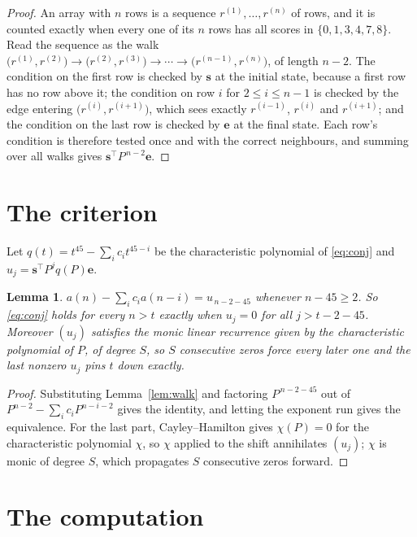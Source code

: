 \documentclass[11pt,a4paper]{article}
\theoremstyle{plain}
\newtheorem{lemma}[theorem]{Lemma}
\theoremstyle{definition}
\begin{document}
\begin{proof}
An array with $n$ rows is a sequence $r^{(1)},\dots,r^{(n)}$ of rows, and it is counted
exactly when every one of its $n$ rows has all scores in $\{0,1,3,4,7,8\}$. Read the sequence as the
walk $\bigl(r^{(1)},r^{(2)}\bigr)\to\bigl(r^{(2)},r^{(3)}\bigr)\to\cdots\to
\bigl(r^{(n-1)},r^{(n)}\bigr)$, of length $n-2$. The condition on the first row is
checked by $\mathbf{s}$ at the initial state, because a first row has no row above it; the
condition on row $i$ for $2\le i\le n-1$ is checked by the edge entering
$\bigl(r^{(i)},r^{(i+1)}\bigr)$, which sees exactly $r^{(i-1)}$, $r^{(i)}$ and
$r^{(i+1)}$; and the condition on the last row is checked by $\mathbf{e}$ at the final
state. Each row's condition is therefore tested once and with the correct neighbours, and
summing over all walks gives $\mathbf{s}^{\!\top}P^{\,n-2}\mathbf{e}$.
\end{proof}

\section{The criterion}

Let $q(t)=t^{45}-\sum_i c_i t^{45-i}$ be the characteristic polynomial of
\eqref{eq:conj} and $u_j=\mathbf{s}^{\!\top}P^{j}q(P)\mathbf{e}$.

\begin{lemma}\label{lem:crit}
$a(n)-\sum_i c_i a(n-i)=u_{\,n-2-45}$ whenever $n-45\ge2$. So \eqref{eq:conj}
holds for every $n>t$ exactly when $u_j=0$ for all $j>t-2-45$. Moreover $(u_j)$
satisfies the monic linear recurrence given by the characteristic polynomial of $P$, of
degree $S$, so $S$ consecutive zeros force every later one and the last nonzero $u_j$ pins
$t$ down exactly.
\end{lemma}

\begin{proof}
Substituting Lemma~\ref{lem:walk} and factoring $P^{\,n-2-45}$ out of
$P^{n-2}-\sum_i c_i P^{n-i-2}$ gives the identity, and letting the exponent run gives the
equivalence. For the last part, Cayley--Hamilton gives $\chi(P)=0$ for the characteristic
polynomial $\chi$, so $\chi$ applied to the shift annihilates $(u_j)$; $\chi$ is monic of
degree $S$, which propagates $S$ consecutive zeros forward.
\end{proof}

\section{The computation}
\end{document}
